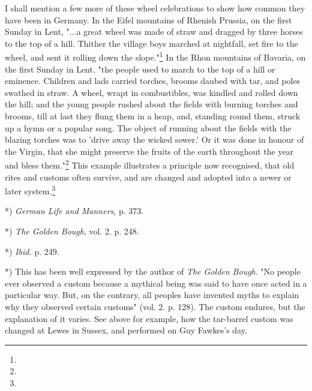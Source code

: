 \documentclass[a4paper, 11pt, oneside, polutonikogreek, english]{article}
\begin{document}
I shall mention a few more of these wheel celebrations to show how common they have been in Germany. In the Eifel mountains of Rhenish Prussia, on the first Sunday in Lent, "...a great wheel was made of straw and dragged by three horses to the top of a hill. Thither the village boys marched at nightfall, set fire to the wheel, and sent it rolling down the slope."\footnote{} In the Rhon mountains of Bavaria, on the first Sunday in Lent, "the people used to march to the top of a hill or eminence. Children and lads carried torches, brooms daubed with tar, and poles swathed in straw. A wheel, wrapt in combustibles, was kindled and rolled down the hill; and the young people rushed about the fields with burning torches and brooms, till at last they flung them in a heap, and, standing round them, struck up a hymn or a popular song. The object of running about the fields with the blazing torches was to 'drive away the wicked sower.' Or it was done in honour of the Virgin, that she might preserve the fruits of the earth throughout the year and bless them."\footnote{} This example illustrates a principle now recognised, that old rites and customs often survive, and are changed and adopted into a newer or later system.\footnote{}

*) \emph{German Life and Manners}, p. 373.

*) \emph{The Golden Bough}, vol. 2. p. 248.

*) \emph{Ibid.} p. 249.

*) This has been well expressed by the author of \emph{The Golden Bough}. "No people ever observed a custom because a mythical being was said to have once acted in a particular way. But, on the contrary, all peoples have invented myths to explain why they observed certain customs" (vol. 2. p. 128). The custom endures, but the explanation of it varies. See above for example, how the tar-barrel custom was changed at Lewes in Sussex, and performed on Guy Fawkes's day.
\end{document}

